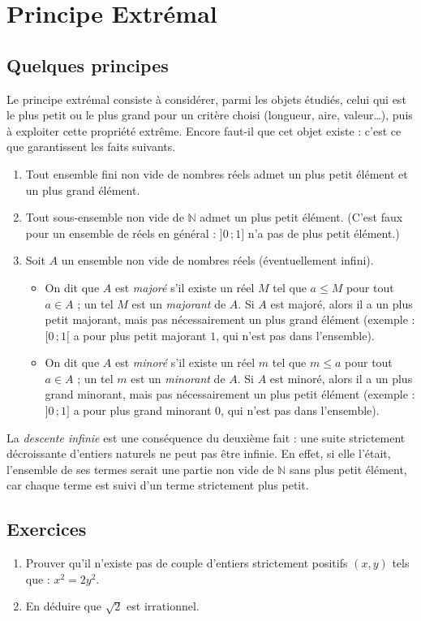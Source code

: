 \chapter{Principe Extrémal}

	\section{Quelques principes}
Le principe extrémal consiste à considérer, parmi les objets étudiés, celui qui est le plus petit ou le plus grand pour un critère choisi (longueur, aire, valeur\ldots), puis à exploiter cette propriété extrême. Encore faut-il que cet objet existe : c'est ce que garantissent les faits suivants.
\begin{enumerate}
	\item Tout ensemble fini non vide de nombres réels admet un plus petit élément et un plus grand élément. 
	\item Tout sous-ensemble non vide de $\mathbb{N}$ admet un plus petit élément. (C'est faux pour un ensemble de réels en général : $]0\,;1]$ n'a pas de plus petit élément.)
	\item Soit $A$ un ensemble non vide de nombres réels (éventuellement infini). 
	\begin{itemize}
		\item On dit que $A$ est \emph{majoré} s'il existe un réel $M$ tel que $a \leq M$ pour tout $a \in A$ ; un tel $M$ est un \emph{majorant} de $A$. Si $A$ est majoré, alors il a un plus petit majorant, mais pas nécessairement un plus grand élément (exemple : $[0\,;1[$ a pour plus petit majorant $1$, qui n'est pas dans l'ensemble). 
		\item On dit que $A$ est \emph{minoré} s'il existe un réel $m$ tel que $m \leq a$ pour tout $a \in A$ ; un tel $m$ est un \emph{minorant} de $A$. Si $A$ est minoré, alors il a un plus grand minorant, mais pas nécessairement un plus petit élément (exemple : $]0\,;1]$ a pour plus grand minorant $0$, qui n'est pas dans l'ensemble).
	\end{itemize}
\end{enumerate}
La \emph{descente infinie} est une conséquence du deuxième fait : une suite strictement décroissante d'entiers naturels ne peut pas être infinie. En effet, si elle l'était, l'ensemble de ses termes serait une partie non vide de $\mathbb{N}$ sans plus petit élément, car chaque terme est suivi d'un terme strictement plus petit.


\section{Exercices}
\begin{exercise}
	\begin{enumerate}
		\item Prouver qu'il n'existe pas de couple d'entiers strictement positifs $(x,y)$ tels que : $x^2 = 2 y^2$.
		\item En déduire que $\sqrt{2}$ est irrationnel.
	\end{enumerate}
\end{exercise}


